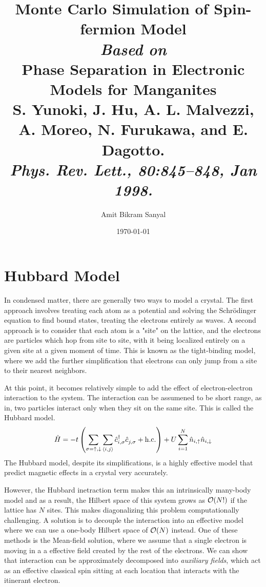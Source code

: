 \documentclass[]{article}
\title{Monte Carlo Simulation of Spin-fermion Model\\
	\vspace{1cm}
	{\large \emph{Based on}\\ \vspace{2mm}
	Phase Separation in Electronic Models for Manganites\\
	S. Yunoki, J. Hu, A. L. Malvezzi, A. Moreo, N. Furukawa, and
	E. Dagotto.\\
	\emph{Phys. Rev. Lett., 80:845–848, Jan 1998.}}
}
\author{Amit Bikram Sanyal}
\date{\today}
\newcommand{\ham}{\hat{H}}
\begin{document}
\maketitle

\section{Hubbard Model}
In condensed matter, there are generally two ways to model a crystal. The first approach involves treating each atom as a potential and solving the Schr\"{o}dinger equation to find bound states, treating the electrons entirely as waves. A second approach is to consider that each atom is a "site" on the lattice, and the electrons are particles which hop from site to site, with it being localized entirely on a given site at a given moment of time. This is known as the tight-binding model, where we add the further simplification that electrons can only jump from a site to their nearest neighbors.

At this point, it becomes relatively simple to add the effect of electron-electron interaction to the system. The interaction can be assumened to be short range, as in, two particles interact only when they sit on the same site. This is called the Hubbard model.
\begin{align}\label{eqn:tight-binding-hamil}
\ham = -t \left(\sum_{\sigma = \uparrow, \downarrow} \sum_{\expval{i,j}}^{} \hat{c}^{\dagger}_{i, \sigma} \hat{c}^{}_{j, \sigma} + \mathrm{h.c.} \right) + U \sum_{i=1}^{N}\hat{n}_{i,\uparrow} \hat{n}_{i,\downarrow}
\end{align}
The Hubbard model, despite its simplifications, is a highly effective model that predict magnetic effects in a crystal very accurately.

However, the Hubbard inetraction term makes this an intrinsically many-body model and as a result, the Hilbert space of this system grows as $ \order{N!} $ if the lattice has $ N $ sites. This makes diagonalizing this problem computationally challenging. A solution is to decouple the interaction into an effective model where we can use a one-body Hilbert space of $ \order{N} $ instead. One of these methods is the Mean-field solution, where we assume that a single electron is moving in a a effective field created by the rest of the electrons. We can show that interaction can be approximately decomposed into \emph{auxiliary fields}, which act as an effective classical spin sitting at each location that interacts with the itinerant electron.
\end{document}

